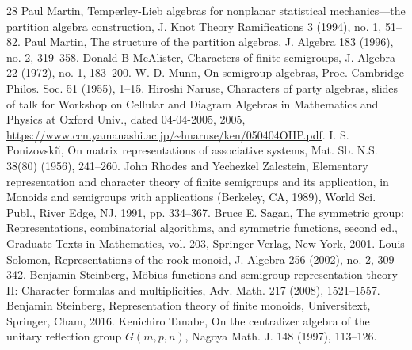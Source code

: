 \documentclass[10pt]{amsart}
\theoremstyle{definition}
\theoremstyle{remark}
\begin{document}
\begin{thebibliography}{28}
 Paul Martin, Temperley-Lieb algebras for nonplanar statistical mechanics---the partition algebra construction, J. Knot Theory Ramifications 3 (1994), no. 1, 51--82.
 Paul Martin, The structure of the partition algebras, J. Algebra 183 (1996), no. 2, 319--358.
 Donald B McAlister, Characters of finite semigroups, J. Algebra 22 (1972), no. 1, 183--200.
 W. D. Munn, On semigroup algebras, Proc. Cambridge Philos. Soc. 51 (1955), 1--15.
 Hiroshi Naruse, Characters of party algebras, slides of talk for Workshop on Cellular and Diagram Algebras in Mathematics and Physics at Oxford Univ., dated 04-04-2005, 2005, \url{https://www.ccn.yamanashi.ac.jp/~hnaruse/ken/050404OHP.pdf}.
 I. S. Ponizovski\u\i, On matrix representations of associative systems, Mat. Sb. N.S. 38(80) (1956), 241--260.
 John Rhodes and Yechezkel Zalcstein, Elementary representation and character theory of finite semigroups and its application, in Monoids and semigroups with applications (Berkeley, CA, 1989), World Sci. Publ., River Edge, NJ, 1991, pp. 334--367.
 Bruce E. Sagan, The symmetric group: Representations, combinatorial algorithms, and symmetric functions, second ed., Graduate Texts in Mathematics, vol. 203, Springer-Verlag, New York, 2001.
 Louis Solomon, Representations of the rook monoid, J. Algebra 256 (2002), no. 2, 309--342.
 Benjamin Steinberg, M\"obius functions and semigroup representation theory II: Character formulas and multiplicities, Adv. Math. 217 (2008), 1521--1557.
 Benjamin Steinberg, Representation theory of finite monoids, Universitext, Springer, Cham, 2016.
 Kenichiro Tanabe, On the centralizer algebra of the unitary reflection group $G(m,p,n)$, Nagoya Math. J. 148 (1997), 113--126.
\end{thebibliography}
\end{document}
